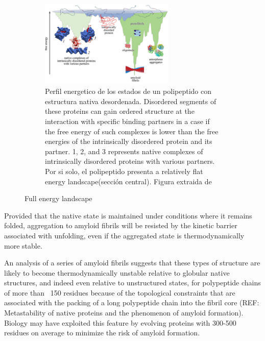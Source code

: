 \begin{figure}[htbp]
\begin{subfigure}[htbp]{\linewidth}
\centering
\includegraphics[width=0.7\textwidth]{img/idpEnLandscape.png} 
\caption{Perfil energetico de los estados de un polipeptido con estructura nativa desordenada. 
Disordered segments of these proteins can gain ordered structure at the interaction with specific binding partners in a case if the free energy of such complexes is lower 
than the free energies of the intrinsically disordered protein and its partner. 
1, 2, and 3 represents native complexes of intrinsically disordered proteins with various partners.
Por si solo, el polipeptido presenta a relatively flat energy landscape(sección central). Figura extraida de \cite{turoverov2010protein}}
\label{idpFullEnLandscape}
\end{subfigure}
 \caption{Full energy landscape}
 \label{fullEnLandscape}
\end{figure}


Provided that the native
state is maintained under conditions where it remains
folded, aggregation to amyloid fibrils will be resisted by
the kinetic barrier associated with unfolding, even if the
aggregated state is thermodynamically more stable.


An analysis of a series of amyloid fibrils suggests that
these types of structure are likely to become thermodynamically unstable relative to globular native structures, and indeed even relative to unstructured states, for
polypeptide chains of more than ~150 residues because
of the topological constraints that are associated with the
packing of a long polypeptide chain into the fibril core (REF: Metastability of native proteins and the phenomenon of amyloid formation).
Biology may have exploited this feature by evolving proteins with 300-500 residues on average to minimize the
risk of amyloid formation. 

